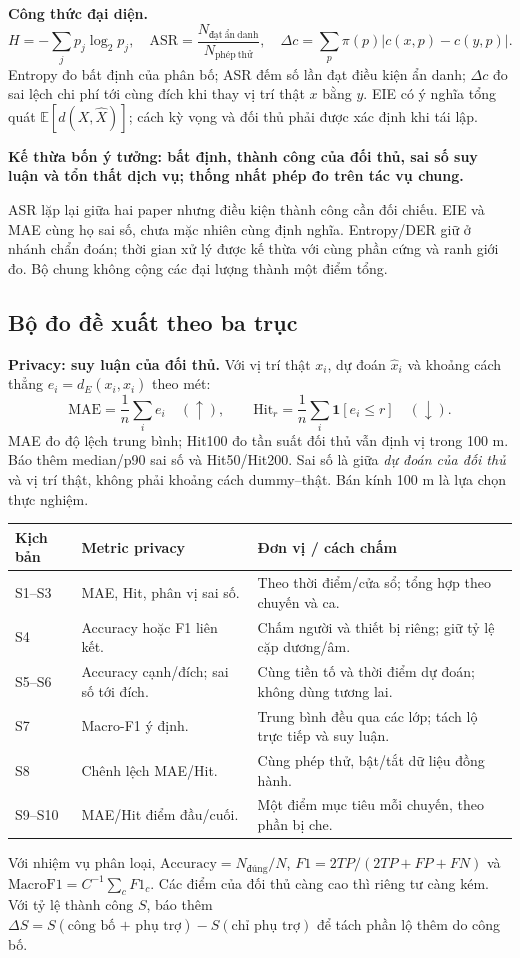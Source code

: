 \documentclass[10pt,a4paper]{article}
\newcommand{\key}[1]{\par\smallskip\noindent\colorbox{pale}{\parbox{\dimexpr\linewidth-2\fboxsep}{\textbf{#1}}}\par\smallskip}
\newcommand{\up}{\ensuremath{\uparrow}}\newcommand{\down}{\ensuremath{\downarrow}}
\begin{document}
\textbf{Công thức đại diện.}
\[
H=-\sum_jp_j\log_2p_j,\quad
\mathrm{ASR}=\frac{N_{\mathrm{đạt\ ẩn\ danh}}}{N_{\mathrm{phép\ thử}}},\quad
\Delta c=\sum_p\pi(p)|c(x,p)-c(y,p)|.
\]
Entropy đo bất định của phân bố; ASR đếm số lần đạt điều kiện ẩn danh; $\Delta c$ đo sai lệch chi phí tới cùng đích khi thay vị trí thật $x$ bằng $y$. EIE có ý nghĩa tổng quát $\mathbb E[d(X,\widehat X)]$; cách kỳ vọng và đối thủ phải được xác định khi tái lập.

\key{Kế thừa bốn ý tưởng: bất định, thành công của đối thủ, sai số suy luận và tổn thất dịch vụ; thống nhất phép đo trên tác vụ chung.}
ASR lặp lại giữa hai paper nhưng điều kiện thành công cần đối chiếu. EIE và MAE cùng họ sai số, chưa mặc nhiên cùng định nghĩa. Entropy/DER giữ ở nhánh chẩn đoán; thời gian xử lý được kế thừa với cùng phần cứng và ranh giới đo. Bộ chung không cộng các đại lượng thành một điểm tổng.

\newpage
\subsection{Bộ đo đề xuất theo ba trục}
\textbf{Privacy: suy luận của đối thủ.} Với vị trí thật $x_i$, dự đoán $\widehat x_i$ và khoảng cách thẳng $e_i=d_E(x_i,\widehat x_i)$ theo mét:
\[
\mathrm{MAE}=\frac1n\sum_i e_i\quad(\up),\qquad
\mathrm{Hit}_r=\frac1n\sum_i\mathbf1[e_i\le r]\quad(\down).
\]
MAE đo độ lệch trung bình; Hit100 đo tần suất đối thủ vẫn định vị trong 100 m. Báo thêm median/p90 sai số và Hit50/Hit200. Sai số là giữa \emph{dự đoán của đối thủ} và vị trí thật, không phải khoảng cách dummy--thật. Bán kính 100 m là lựa chọn thực nghiệm.

\par\small
\begin{tabularx}{\linewidth}{@{}P{2.3cm}Y Y@{}}
\toprule\textbf{Kịch bản}&\textbf{Metric privacy}&\textbf{Đơn vị / cách chấm}\\\midrule
S1--S3 & MAE, Hit, phân vị sai số. & Theo thời điểm/cửa sổ; tổng hợp theo chuyến và ca.\\
S4 & Accuracy hoặc F1 liên kết. & Chấm người và thiết bị riêng; giữ tỷ lệ cặp dương/âm.\\
S5--S6 & Accuracy cạnh/đích; sai số tới đích. & Cùng tiền tố và thời điểm dự đoán; không dùng tương lai.\\
S7 & Macro-F1 ý định. & Trung bình đều qua các lớp; tách lộ trực tiếp và suy luận.\\
S8 & Chênh lệch MAE/Hit. & Cùng phép thử, bật/tắt dữ liệu đồng hành.\\
S9--S10 & MAE/Hit điểm đầu/cuối. & Một điểm mục tiêu mỗi chuyến, theo phần bị che.\\\bottomrule
\end{tabularx}
\normalsize
Với nhiệm vụ phân loại, $\mathrm{Accuracy}=N_{\mathrm{đúng}}/N$,
$F1=2TP/(2TP+FP+FN)$ và $\mathrm{MacroF1}=C^{-1}\sum_cF1_c$.
Các điểm của đối thủ càng cao thì riêng tư càng kém. Với tỷ lệ thành công $S$, báo thêm $\Delta S=S(\text{công bố + phụ trợ})-S(\text{chỉ phụ trợ})$ để tách phần lộ thêm do công bố.
\end{document}

